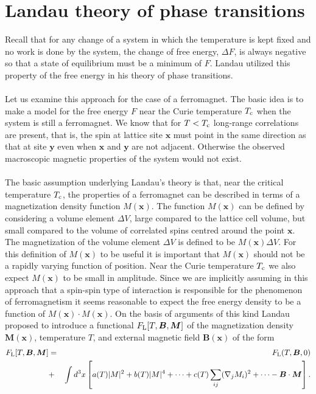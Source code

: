 \section{Landau theory of phase transitions}
Recall that for any change of a system in which the temperature is kept fixed and no work is done by the system, the change of free energy, $\Delta F$, is always negative so that a state of equilibrium must be a minimum of $F$. Landau utilized this property of the free energy in his theory of phase transitions.
\\ \\
Let us examine this approach for the case of a ferromagnet. The basic idea is to make a model for the free energy $F$ near the Curie temperature $T_{\rm c}$ when the system is still a ferromagnet. We know that for $T < T_{\rm c}$ long-range correlations are present, that is, the spin at lattice site $\bm{x}$ must point in the same direction as that at site $\bm{y}$ even when $\bm{x}$ and $\bm{y}$ are not adjacent. Otherwise the observed macroscopic magnetic properties of the system would not exist.
\\ \\
The basic assumption underlying Landau's theory is that, near the critical temperature $T_{\rm c}$, the properties of a ferromagnet can be described in terms of a magnetization density function $M(\bm{x})$. 
The function $M(\bm{x})$ can be defined by considering a volume element $\Delta V$, large compared to the lattice cell volume, but small compared to the volume of correlated spins centred around the point $\bm{x}$. 
The magnetization of the volume element $\Delta V$ is defined to be $M(\bm{x}) \Delta V$. For this definition of $M(\bm{x})$ to be useful it is important that $M(\bm{x})$ should not be a rapidly varying function of position. Near the Curie temperature $T_{\rm c}$ we also expect $M(\bm{x})$ to be small in amplitude. 
Since we are implicitly assuming in this approach that a spin-spin type of interaction is responsible for the phenomenon of ferromagnetism it seems reasonable to expect the free energy density to be a function of $M(\bm{x})\cdot M(\bm{x})$. On the basis of arguments of this kind Landau proposed to introduce a functional $F_{\rm L}[T,\bm{B},\bm{M}]$ of the magnetization density $\bm{M}(\bm{x})$, temperature $T$, and external magnetic field $\bm{B}(\bm{x})$ of the form
\begin{eqnarray}
F_{\rm L}[T,\bm{B},\bm{M}] &=& F_{\rm L}(T,\bm{B},0) \nonumber \\
&+& \int d^3x \left[ a(T)|M|^2 + b(T)|M|^4 + \cdots + c(T)\sum_{ij} (\nabla_jM_i)^2 + \cdots - \bm{B}\cdot\bm{M} \right]. \nonumber
\end{eqnarray}
